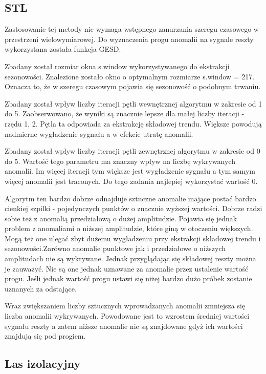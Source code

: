 \documentclass{article}
\begin{document}
\subsection{STL}
Zastosowanie tej metody nie wymaga wstępnego zanurzania szeregu czasowego w przestrzeni wielowymiarowej. Do wyznaczenia progu anomalii na sygnale reszty wykorzystana została funkcja GESD.

Zbadany został rozmiar okna s.window wykorzystywanego do ekstrakcji sezonowości. Znalezione zostało okno o optymalnym rozmiarze s.window = 217. Oznacza to, że w szeregu czasowym pojawia się sezonowość o podobnym trwaniu.   

Zbadany został wpływ liczby iteracji pętli wewnętrznej algorytmu w zakresie od 1 do 5. Zaobserwowano, że wyniki są znacznie lepsze dla małej liczby iteracji - rzędu 1, 2. Pętla ta odpowiada za ekstrakcję składowej trendu. Większe powodują nadmierne wygładzenie sygnału a w efekcie utratę anomalii. 

Zbadany został wpływ liczby iteracji pętli zewnętrznej algorytmu w zakresie od 0 do 5. Wartość tego parametru ma znaczny wpływ na liczbę wykrywanych anomalii. Im więcej iteracji tym większe jest wygładzenie sygnału a tym samym więcej anomalii jest traconych. Do tego zadania najlepiej wykorzystać wartość 0. 

Algorytm ten bardzo dobrze odnajduje sztuczne anomalie mające postać bardzo cienkiej szpilki - pojedynczych punktów o znacznie wyższej wartości. Dobrze radzi sobie też z anomalią przedziałową o dużej amplitudzie. Pojawia się jednak problem z anomaliami o niższej amplitudzie, które giną w otoczeniu większych. Mogą też one ulegać zbyt dużemu wygładzeniu przy ekstrakcji składowej trendu i sezonowości.Zarówno anomalie punktowe jak i przedziałowe o niższych amplitudach nie są wykrywane. Jednak przyglądając się składowej reszty można je zauważyć. Nie są one jednak uznawane za anomalie przez ustalenie wartość progu. Jeśli jednak wartość progu ustawi się niżej bardzo dużo próbek zostanie uznanych za odstające. 

Wraz zwiększaniem liczby sztucznych wprowadzanych anomalii zmniejsza się liczba anomalii wykrywanych. Powodowane jest to wzrostem średniej wartości sygnału reszty a zatem niższe anomalie nie są znajdowane gdyż ich wartości znajdują się pod progiem. 

\subsection{Las izolacyjny}
\end{document}
